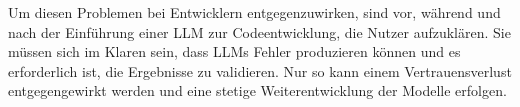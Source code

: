 Um diesen Problemen bei Entwicklern entgegenzuwirken, sind vor, während und nach der Einführung einer LLM zur Codeentwicklung, die Nutzer aufzuklären. Sie müssen sich im Klaren sein, dass LLMs Fehler produzieren können und es erforderlich ist, die Ergebnisse zu validieren. Nur so kann einem Vertrauensverlust entgegengewirkt werden und eine stetige Weiterentwicklung der Modelle erfolgen.








